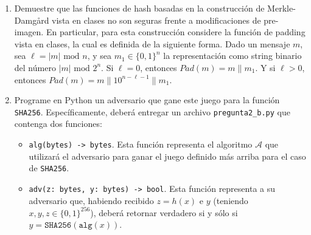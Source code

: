 \begin{enumerate}

\item Demuestre que las funciones de hash basadas en la construcción de Merkle-Damgård vista en clases no son seguras frente a modificaciones de pre-imagen. En particular, para esta construcción considere la función de padding vista en clases, la cual es definida de la siguiente forma. Dado un mensaje $m$, sea $\ell = |m| \text{ mod } n$, y sea $m_1 \in \{0,1\}^n$ la representación como string binario del número $|m| \text{ mod } 2^n$. Si $\ell = 0$, entonces $\textit{Pad}(m) = m \| m_1$. Y si $\ell > 0$, entonces $\textit{Pad}(m) = m \| 1 0^{n - \ell - 1} \| m_1$.



\item Programe en Python un adversario que gane este juego para la función \texttt{SHA256}. Específicamente, deberá entregar un archivo \texttt{pregunta2\_b.py} que contenga dos funciones:
\begin{itemize}
\item \texttt{alg(bytes) -> bytes}. Esta función representa el algoritmo $\mathcal{A}$ que utilizará el adversario para ganar el juego definido más arriba para el caso de \texttt{SHA256}.
\item \texttt{adv(z: bytes, y: bytes) -> bool}. Esta función representa a su adversario que, habiendo recibido $z=h(x)$ e $y$ (teniendo $x,y,z\in\{0,1\}^{256}$), deberá retornar verdadero si y sólo si $y=\texttt{SHA256}(\texttt{alg}(x))$.
\end{itemize}

\end{enumerate}

\medskip

